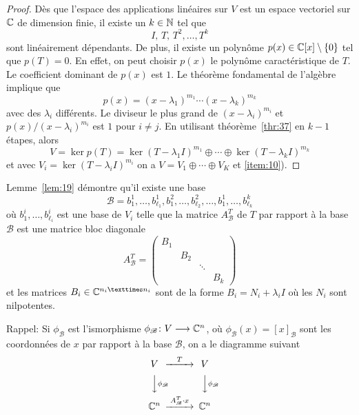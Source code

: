 \begin{proof}
  Dès que l'espace des applications linéaires sur $V$ est un espace vectoriel sur $\mathbb{C}$ de dimension finie, il existe un $k \in \mathbb{N}$ tel que 
  \begin{displaymath}
    I, \, T, \, T^2, \dots, T^k
  \end{displaymath}
sont linéairement dépendants. De plus, il existe un polynôme $p(x) \in \mathbb{C}[x] \setminus \{ 0 \}$ tel que $p(T) = 0$. En effet, on peut choisir $p(x)$ le polynôme 
caractéristique de $T$. Le coefficient dominant de $p(x)$ est $1$.   Le théorème fondamental de l'algèbre implique que 
\begin{displaymath}
  p(x) = ( x - λ_1)^{m_1} \cdots ( x - λ_k)^{m_k} 
\end{displaymath}
avec des $λ_i$ différents. 
Le diviseur le plus grand de $( x - λ_i)^{m_i}$ et $p(x) / ( x - λ_i)^{m_i}$ est $1$ pour $i ≠ j$. En utilisant théorème~\ref{thr:37} en $k-1$ étapes, alors 
\begin{displaymath} 
V =   \ker p(T) = \ker (T - λ_1I)^{m_1} ⊕  \cdots ⊕ \ker( T - λ_kI)^{m_k}
\end{displaymath}
et avec $V_i = \ker( T - λ_iI)^{m_i}$ on a $V = V_1 ⊕ \cdots ⊕ V_K$  et \ref{item:10}). 
\end{proof}


\begin{remark}
  \label{rem:3}
  Lemme~\ref{lem:19} démontre qu'il existe une base 
  \begin{displaymath}
  \mathscr{B} =   b_1^1,\dots,b_{\ell_1}^1,b_1^2,\dots,b_{\ell_2}^2,\dots,b_1^1,\dots,b_{\ell_k}^k
  \end{displaymath}
  où $b_1^i,\dots,b_{\ell_i}^i$ est une base de $V_i$ telle que la matrice $A^T_\mathscr{B}$ de $T$ par rapport à la base $\mathscr{B}$ est une matrice bloc diagonale 
  \begin{displaymath}
      A^T_{\mathscr{B} }  =
      \begin{pmatrix}
        B_1 \\
        & B_2 \\
        & & \ddots \\
        & &  & B_k
      \end{pmatrix}
  \end{displaymath}
et les matrices $B_i \in \C^{n_i × n_i}$ sont de la forme $B_i = N_i + λ_i I$ où les $N_i$ sont  nilpotentes. 

Rappel: Si  $\phi_{\mathscr{B}}$ est l'ismorphisme $\phi_{\mathscr{B}} \colon V \longrightarrow \mathbb{C}^n$, où $\phi_{\mathscr{B}}(x) = [x]_{\mathscr{B}}$ sont les coordonnées de $x$ par rapport à la base ${\mathscr{B}}$,  on a le diagramme suivant 
\begin{displaymath}
  {
  \begin{CD}
    V     @>T>>  V\\
    @VV \phi_{\mathscr{B}} V        @VV \phi_{\mathscr{B}} V\\ 
    \C^n     @>A^T_{\mathscr{B}} \cdot x>>  \C^n
  \end{CD}} 
\end{displaymath} 
\end{remark}

